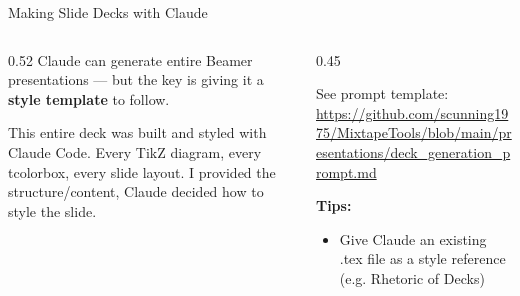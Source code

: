 \documentclass[aspectratio=169, 11pt]{beamer}
\newcommand{\emphgold}[1]{\alert{\textbf{#1}}}
\begin{document}
\begin{frame}{Making Slide Decks with Claude}
\begin{columns}[T]
\begin{column}{0.52\textwidth}
  {\small Claude can generate entire Beamer presentations --- but the key is giving it a \emphgold{style template} to follow.}
  \vspace{0.1cm}
  \vspace{0.15cm}
  \begin{keyinsight}
    This entire deck was built and styled with Claude Code. Every TikZ diagram, every tcolorbox, every slide layout. I provided the structure/content, Claude decided how to style the slide. 
  \end{keyinsight}
\end{column}
\begin{column}{0.45\textwidth}
  \begin{quotebox}
    See prompt template: \url{https://github.com/scunning1975/MixtapeTools/blob/main/presentations/deck_generation_prompt.md}
  
  \end{quotebox}
  \vspace{0.1cm}
  {\small\bfseries\color{navy} Tips:}
  \begin{itemize}\small
    \item Give Claude an existing .tex file as a style reference (e.g. Rhetoric of Decks)
   \end{itemize}
\end{column}
\end{columns}
\end{frame}
\end{document}

